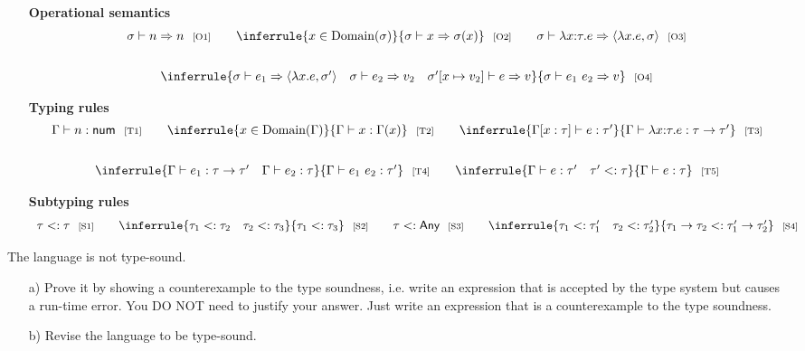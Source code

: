\begin{enumerate}
\begin{itemize}
  \item[] \textbf{Operational semantics}
\[
  \begin{array}{c}
    \sigma\vdash n\Rightarrow n
    \ \ \text{\scriptsize[O1]}
    \qquad
    \inferrule
    { x\in\Dom{\sigma} }
    { \sigma\vdash x\Rightarrow \sigma(x) }
    \ \ \text{\scriptsize[O2]}
    \qquad
    \sigma\vdash\lambda x{:}\tau.e\Rightarrow\clo{x}{e}{\sigma}
    \ \ \text{\scriptsize[O3]}
    \\[20pt]
    \inferrule
    { \sigma\vdash e_1\Rightarrow \clo{x}{e}{\sigma'} \rulesep
      \sigma\vdash e_2\Rightarrow v_2 \rulesep
      \sigma'[x\mapsto v_2]\vdash e\Rightarrow v }
    { \sigma\vdash e_1\ e_2\Rightarrow v }
    \ \ \text{\scriptsize[O4]}
  \end{array}
\]
    \item[] \textbf{Typing rules}
\[
  \begin{array}{c}
    \Gamma\vdash n:\textsf{num}
    \ \ \text{\scriptsize[T1]}
    \qquad
    \inferrule
    { x\in\Dom{\Gamma} }
    { \Gamma\vdash x:\Gamma(x) }
    \ \ \text{\scriptsize[T2]}
    \qquad
    \inferrule
    { \Gamma[x:\tau]\vdash e:\tau' }
    { \Gamma\vdash \lambda x{:}\tau.e:\tau\rightarrow\tau' }
    \ \ \text{\scriptsize[T3]}
    \\[20pt]
    \inferrule
    { \Gamma\vdash e_1:\tau\rightarrow\tau' \rulesep
      \Gamma\vdash e_2:\tau }
    { \Gamma\vdash e_1\ e_2:\tau' }
    \ \ \text{\scriptsize[T4]}
    \qquad
    \inferrule
    { \Gamma\vdash e:\tau' \rulesep
      \tau'<:\tau }
    { \Gamma\vdash e:\tau }
    \ \ \text{\scriptsize[T5]}
  \end{array}
\]

    \item[] \textbf{Subtyping rules}
\[
  \begin{array}{c@{\hskip20pt}c@{\hskip20pt}c@{\hskip20pt}c}
    \tau<:\tau
    \ \ \text{\scriptsize[S1]}
    &
    \inferrule
    { \tau_1<:\tau_2 \rulesep \tau_2<:\tau_3 }
    { \tau_1<:\tau_3 }
    \ \ \text{\scriptsize[S2]}
    &
    \tau<:\textsf{Any}
    \ \ \text{\scriptsize[S3]}
    &
    \inferrule
    { \tau_1<:\tau_1' \rulesep \tau_2<:\tau_2' }
    { \tau_1\rightarrow\tau_2<:\tau_1'\rightarrow\tau_2' }
    \ \ \text{\scriptsize[S4]}
  \end{array}
\]
\end{itemize}

The language is not type-sound.
\begin{itemize}
  \item[a)] Prove it by showing a counterexample to the
type soundness, i.e. write an expression that is accepted by the type system but
causes a run-time error. You DO NOT need to justify your answer. Just write an
expression that is a counterexample to the type soundness.
  \item[b)] Revise the language to be type-sound.
\end{itemize}


\end{enumerate}
